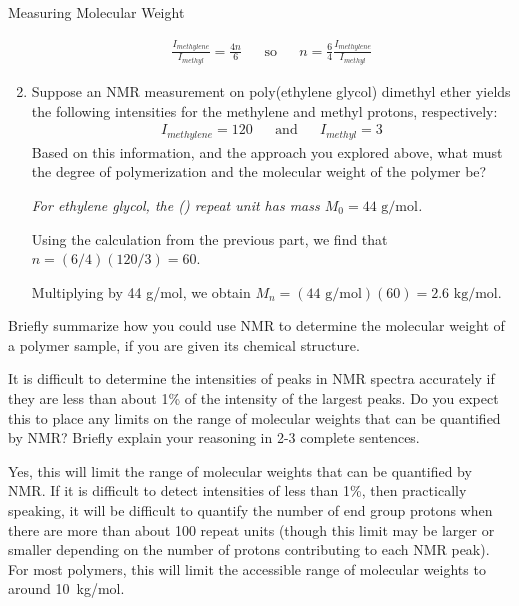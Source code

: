 \begin{activity}{Measuring Molecular Weight}
\begin{ctqs}
\begin{enumerate}
				\begin{solution}[1.25in]
					\begin{align*}
						\frac{I_{methylene}}{I_{methyl}} = \frac{4n}{6} && \text{so} && n = \frac{6}{4}\frac{I_{methylene}}{I_{methyl}}
					\end{align*}
				\end{solution}
				
			\item Suppose an NMR measurement on poly(ethylene glycol) dimethyl ether yields the following intensities for the methylene and methyl protons, respectively:
				\begin{align*}
					I_{methylene}=120 && \text{and} &&
					I_{methyl}=3
				\end{align*}
				Based on this information, and the approach you explored above, what must the degree of polymerization and the molecular weight of the polymer be?
				
				\emph{For ethylene glycol, the () repeat unit has mass $M_0=44\text{ g/mol}$.}
				
				\begin{solution}[1.5in]
					Using the calculation from the previous part, we find that $n = (6/4)(120/3) = 60$.
					
					Multiplying by 44 g/mol, we obtain $M_n = (44\text{ g/mol})(60) = 2.6\text{ kg/mol}$.
				\end{solution}
				
		\end{enumerate}
		
		\question Briefly summarize how you could use NMR to determine the molecular weight of a polymer sample, if you are given its chemical structure.
		
			\begin{solution}[2in]
			\end{solution}
		
		\question It is difficult to determine the intensities of peaks in NMR spectra accurately if they are less than about 1\% of the intensity of the largest peaks.  Do you expect this to place any limits on the range of molecular weights that can be quantified by NMR?  Briefly explain your reasoning in 2-3 complete sentences.
		
			\begin{solution}[2in]
				Yes, this will limit the range of molecular weights that can be quantified by NMR.  If it is difficult to detect intensities of less than 1\%, then practically speaking, it will be difficult to quantify the number of end group protons when there are more than about 100 repeat units (though this limit may be larger or smaller depending on the number of protons contributing to each NMR peak).  For most polymers, this will limit the accessible range of molecular weights to around 10~kg/mol.
			\end{solution}
	

\end{ctqs}
\end{activity}
